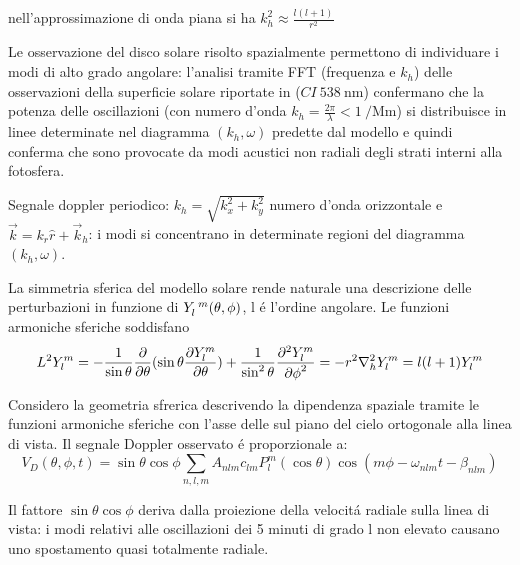 \documentclass[../main.tex]{subfiles}
\begin{document}
\begin{workout}

nell'approssimazione di onda piana si ha $k_h^2\approx\frac{l(l+1)}{r^2}$

Le osservazione del disco solare risolto spazialmente permettono di individuare i modi di alto grado angolare: l'analisi tramite FFT (frequenza e $k_h$) delle osservazioni della superficie solare riportate in \citet{deu75observations} ($CI\ \SI{538}{\nano\meter}$) confermano che la  potenza delle oscillazioni (con numero d'onda $k_h=\frac{2\pi}{\lambda}<\SI{1}{\per\mega\meter}$) si distribuisce in linee determinate nel diagramma $(k_h,\omega)$ predette dal modello e quindi conferma che sono provocate da modi acustici non radiali degli strati interni alla fotosfera.

Segnale doppler periodico: $k_h=\sqrt{k_x^2+k_y^2}$ numero d'onda orizzontale e $\vec{k}=k_r\hat{r}+\vec{k}_h$:  i modi si concentrano in determinate regioni del diagramma  $(k_h,\omega)$.
\end{workout}

\begin{workout}
La simmetria sferica del modello solare rende naturale una descrizione delle perturbazioni in funzione di $Y\indices{_l^m}(\theta,\phi)$, l \'e l'ordine angolare. Le funzioni armoniche sferiche  soddisfano
\begin{equation}
L^2Y_l^m=-\frac{1}{\sin{\theta}}\frac{\partial}{\partial \theta}(\sin{\theta}\frac{\partial Y_l^m}{\partial \theta})+\frac{1}{\sin^2{\theta}}\frac{\partial^2 Y_l^m}{{\partial \phi}^2}=-r^2\nabla_h^2Y_l^m=l(l+1)Y_l^m\label{eq:SHperturb}
\end{equation}


Considero la geometria sfrerica descrivendo la dipendenza spaziale tramite le funzioni armoniche sferiche con l'asse delle sul piano del cielo ortogonale alla linea di vista. Il segnale Doppler osservato \'e proporzionale a:
\begin{equation}
    V_D(\theta,\phi,t)=\sin{\theta}\cos{\phi}\sum_{n,l,m}A_{nlm}c_{lm}P_l^m(\cos{\theta})\cos{(m\phi-\omega_{nlm}t-\beta_{nlm})}
\end{equation}

\end{workout}

Il fattore $\sin{\theta}\cos{\phi}$ deriva dalla proiezione della velocit\'a radiale sulla linea di vista: i modi relativi alle oscillazioni dei 5 minuti di grado l non elevato causano uno spostamento quasi totalmente radiale.
\end{document}
